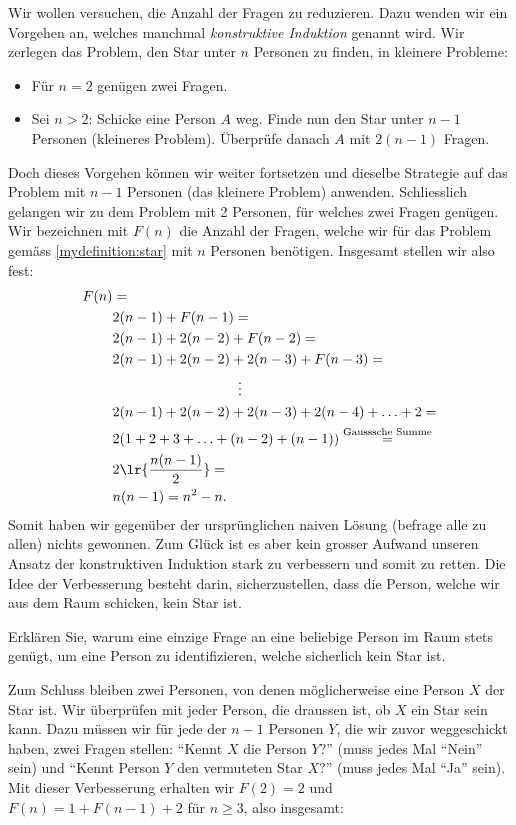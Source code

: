 Wir wollen versuchen, die Anzahl der Fragen zu reduzieren. Dazu wenden wir ein Vorgehen an, welches manchmal \textit{konstruktive Induktion} genannt wird. Wir zerlegen das Problem, den Star unter $n$ Personen zu finden, in kleinere Probleme:
\begin{itemize}
    \item Für $n=2$ genügen zwei Fragen.
    \item Sei $n>2$: Schicke eine Person $A$ weg. Finde nun den Star unter $n-1$ Personen (kleineres Problem). Überprüfe danach $A$ mit $2(n-1)$ Fragen.
\end{itemize}
Doch dieses Vorgehen können wir weiter fortsetzen und dieselbe Strategie auf das Problem mit $n-1$ Personen (das kleinere Problem) anwenden. Schliesslich gelangen wir zu dem Problem mit 2 Personen, für welches zwei Fragen genügen. Wir bezeichnen mit $F(n)$ die Anzahl der Fragen, welche wir für das Problem gemäss \cref{mydefinition:star} mit $n$ Personen benötigen. Insgesamt stellen wir also fest:
\begin{align*}
    F(n) &= \\
    &2(n-1) + F(n-1) =\\
    &2(n-1) + 2(n-2) + F(n-2) =\\
    &2(n-1) + 2(n-2) + 2(n-3) + F(n-3) =\\
    &\quad\quad\quad\quad\quad\quad\quad\quad\quad\vdots \\
    &2(n-1) + 2(n-2) + 2(n-3) + 2(n-4) + \ldots + 2 =\\
    &2(1 + 2 + 3 +\ldots + (n-2) + (n-1)) \stackrel{\text{Gausssche Summe}}{=} \\
    &2\lr{\frac{n(n-1)}{2}} = \\
    &n(n-1) = n^2 - n.
\end{align*}
Somit haben wir gegenüber der ursprünglichen naiven Lösung (befrage alle zu allen) nichts gewonnen. Zum Glück ist es aber kein grosser Aufwand unseren Ansatz der konstruktiven Induktion stark zu verbessern und somit zu retten. Die Idee der Verbesserung besteht darin, sicherzustellen, dass die Person, welche wir aus dem Raum schicken, kein Star ist.
\begin{myexercise}\label{myexercise:0351}
Erklären Sie, warum eine einzige Frage an eine beliebige Person im Raum stets genügt, um eine Person zu identifizieren, welche sicherlich kein Star ist.
\end{myexercise}
\noindent
Zum Schluss bleiben zwei Personen, von denen möglicherweise eine Person $X$ der Star ist. Wir überprüfen mit jeder Person, die draussen ist, ob $X$ ein Star sein kann. Dazu müssen wir für jede der $n-1$ Personen $Y$, die wir zuvor weggeschickt haben, zwei Fragen stellen: \enquote{Kennt $X$ die Person $Y$?} (muss jedes Mal \enquote{Nein} sein) und \enquote{Kennt Person $Y$ den vermuteten Star $X$?} (muss jedes Mal \enquote{Ja} sein). Mit dieser Verbesserung erhalten wir $F(2) = 2$ und $F(n) = 1 + F(n-1) + 2$ für $n\geq 3$, also insgesamt:
